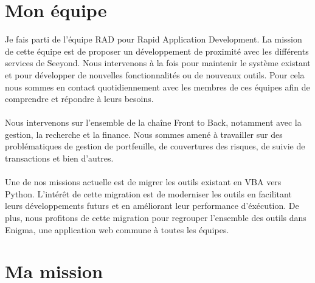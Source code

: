 \newpage



\section*{Mon équipe}
Je fais parti de l'équipe RAD pour Rapid Application Development. La mission de cette équipe est de proposer un développement de proximité avec les différents services de Seeyond. Nous intervenons à la fois pour maintenir le système existant et pour développer de nouvelles fonctionnalités ou de nouveaux outils. Pour cela nous sommes en contact quotidiennement avec les membres de ces équipes afin de comprendre et répondre à leurs besoins.
\\
\\
Nous intervenons sur l'ensemble de la chaîne Front to Back, notamment avec la gestion, la recherche et la finance. Nous sommes amené à travailler sur des problématiques de gestion de portfeuille, de couvertures des risques, de suivie de transactions et bien d'autres.
\\
\\
Une de nos missions actuelle est de migrer les outils existant en VBA vers Python. L'intérêt de cette migration est de moderniser les outils en facilitant leurs développements futurs et en améliorant leur performance d'éxécution. De plus, nous profitons de cette migration pour regrouper l'ensemble des outils dans Enigma, une application web commune à toutes les équipes.

\newpage



\section*{Ma mission}
